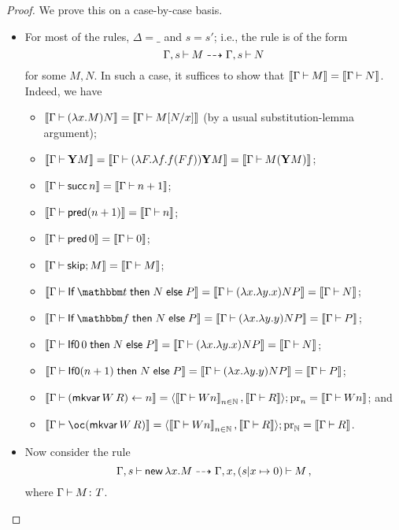 \documentclass[11pt]{report}
\begin{document}
\begin{proof}
  We prove this on a case-by-case basis.
  \begin{itemize}
    \item For most of the rules, $\Delta=\_$ and $s=s'$; i.e., the rule is of the form
      \[
        \Gamma,s\ts M \oopto \Gamma,s \ts N
        \]
      for some $M,N$.
      In such a case, it suffices to show that $\deno{\Gamma\ts M}=\deno{\Gamma\ts N}$.
      Indeed, we have
      \begin{itemize}
        \item $\deno{\Gamma\ts(\lambda x.M)N} = \deno{\Gamma\ts M[N/x]}$ (by a usual substitution-lemma argument);
        \item $\deno{\Gamma\ts\Y M} = \deno{\Gamma\ts (\lambda F.\lambda f.f(F f)) \Y M} = \deno{\Gamma\ts M(\Y M)}$;
        \item $\deno{\Gamma\ts \suc n} = \deno{\Gamma \ts n+1}$;
        \item $\deno{\Gamma\ts \pred (n+1)} = \deno{\Gamma\ts n}$;
        \item $\deno{\Gamma\ts \pred 0} = \deno{\Gamma\ts 0}$;
        \item $\deno{\Gamma\ts\skipp;M} = \deno{\Gamma\ts M}$;
        \item $\deno{\Gamma\ts\If \true \Then N \Else P} = \deno{\Gamma\ts (\lambda x.\lambda y.x)NP} = \deno{\Gamma\ts N}$;
        \item $\deno{\Gamma\ts\If \false \Then N \Else P} = \deno{\Gamma\ts (\lambda x.\lambda y.y)NP} = \deno{\Gamma\ts P}$;
        \item $\deno{\Gamma\ts\IfO 0 \Then N \Else P} = \deno{\Gamma\ts (\lambda x.\lambda y.x)NP} = \deno{\Gamma\ts N}$;
        \item $\deno{\Gamma\ts\IfO (n+1) \Then N \Else P} = \deno{\Gamma\ts (\lambda x.\lambda y.y)NP} = \deno{\Gamma\ts P}$;
        \item \parbox[t][][t]{0.8\textwidth}{$\deno{\Gamma\ts(\mkvar W\,R)\gets n} = \langle \deno{\Gamma\ts Wn}_{n\in\bN},\deno{\Gamma\ts R}\rangle;\pr_n = \deno{\Gamma\ts Wn}$; and}
        \item $\deno{\Gamma\ts\oc(\mkvar W\,R)} = \langle \deno{\Gamma\ts Wn}_{n\in\bN},\deno{\Gamma\ts R}\rangle;\pr_{\bN} = \deno{\Gamma\ts R}$.
      \end{itemize}
    \item Now consider the rule
      \[
        \Gamma,s\ts\neww \lambda x.M\oopto \Gamma,x,(s\vert x\mapsto 0)\ts M\,,
        \]
      where $\Gamma\ts M\from T$.

\end{itemize}
\end{proof}
\end{document}
